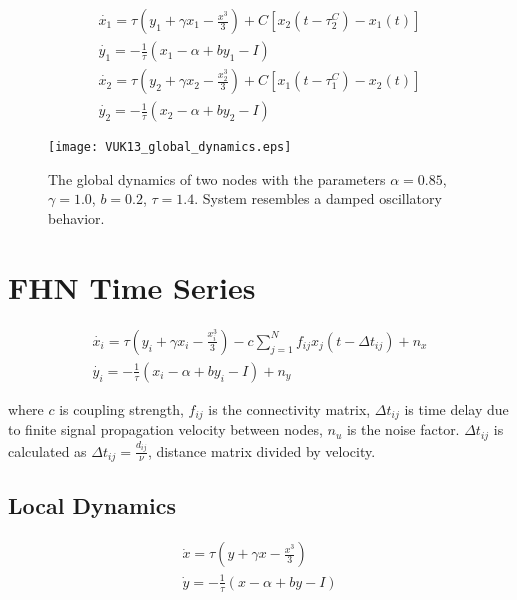 \documentclass[12pt]{article}
\begin{document}
\begin{subequations}
 \begin{align}\dot{x_1} = \tau (y_1 + \gamma x_1 - \frac{x^3}{3}) + C [x_2(t-\tau_2^C)-x_1(t)]  \label{eqn: frobenius 17}\\  \dot{y_1} = -\frac{1}{\tau} (x_1 - \alpha + b y_1 - I ) \label{eqn: frobenius 18} \\ \dot{x_2} = \tau (y_2 + \gamma x_2 - \frac{x_2^3}{3}) + C [x_1(t-\tau_1^C)-x_2(t)] \label{eqn: frobenius 18} \\  \dot{y_2} = -\frac{1}{\tau} (x_2 - \alpha + b y_2 - I ) \end{align} 
\end{subequations}

\begin{figure}[h!]
	\centering
	\texttt{[image: VUK13\_global\_dynamics.eps]}
		\caption{The global dynamics of two nodes with the parameters $\alpha = 0.85$, $\gamma=1.0$, $b=0.2$, $\tau = 1.4$. System resembles a damped oscillatory behavior.}
\end{figure}

\section{FHN Time Series}

\begin{subequations}
 \begin{align}\dot{x_i} = \tau (y_i + \gamma x_i - \frac{x_i^3}{3}) -c \sum_{j=1}^N f_{ij}x_j(t - \Delta t_{ij}) +n_x \label{eqn: frobenius 17}\\  \dot{y_i} = -\frac{1}{\tau} (x_i - \alpha + b y_i - I ) +n_y \label{eqn: frobenius 18}   \end{align} 
\end{subequations}

where $c$ is coupling strength, $f_{ij}$ is the connectivity matrix, $\Delta t_{ij}$ is time delay due to finite signal propagation velocity between nodes, $n_u$ is the noise factor. $\Delta t_{ij}$ is calculated as $\Delta t_{ij}=\frac{d_{ij}}{\nu}$, distance matrix divided by velocity. 

\newpage

\subsection{Local Dynamics}

\begin{subequations}
 \begin{align}\dot{x} = \tau (y + \gamma x - \frac{x^3}{3})  \label{eqn: frobenius 17}\\  \dot{y} = -\frac{1}{\tau} (x - \alpha + b y - I ) \label{eqn: frobenius 18}   \end{align} 
\end{subequations}
\end{document}
